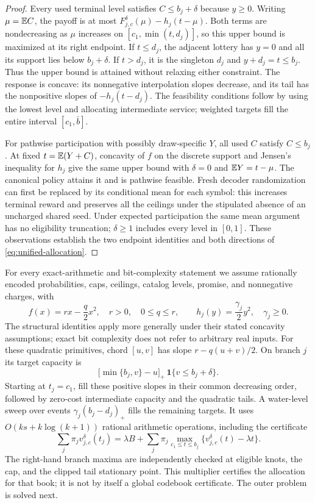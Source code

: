 \begin{proof}
Every used terminal level satisfies $C\leq b_j+\delta$ because $y\geq0$. Writing $\mu=\mathbb E C$, the payoff is at most $F_{j,c}^\delta(\mu)-h_j(t-\mu)$. Both terms are nondecreasing as $\mu$ increases on $[c_1,\min(t,d_j)]$, so this upper bound is maximized at its right endpoint. If $t\leq d_j$, the adjacent lottery has $y=0$ and all its support lies below $b_j+\delta$. If $t>d_j$, it is the singleton $d_j$ and $y+d_j=t\leq b_j$. Thus the upper bound is attained without relaxing either constraint. The response is concave: its nonnegative interpolation slopes decrease, and its tail has the nonpositive slopes of $-h_j(t-d_j)$. The feasibility conditions follow by using the lowest level and allocating intermediate service; weighted targets fill the entire interval $[c_1,\bar b]$.

For pathwise participation with possibly draw-specific $Y$, all used $C$ satisfy $C\leq b_j$. At fixed $t=\mathbb E(Y+C)$, concavity of $f$ on the discrete support and Jensen's inequality for $h_j$ give the same upper bound with $\delta=0$ and $\mathbb E Y=t-\mu$. The canonical policy attains it and is pathwise feasible. Fresh decoder randomization can first be replaced by its conditional mean for each symbol: this increases terminal reward and preserves all the ceilings under the stipulated absence of an uncharged shared seed. Under expected participation the same mean argument has no eligibility truncation; $\delta\geq1$ includes every level in $[0,1]$. These observations establish the two endpoint identities and both directions of \eqref{eq:unified-allocation}.
\end{proof}

For every exact-arithmetic and bit-complexity statement we assume rationally encoded probabilities, caps, ceilings, catalog levels, promise, and nonnegative charges, with
\begin{equation}\label{eq:r34-primitives}
 f(x)=rx-\frac q2 x^2,\quad r>0,\quad 0\leq q\leq r,\qquad
 h_j(y)=\frac{\gamma_j}{2}y^2,\quad\gamma_j\geq0.
\end{equation}
The structural identities apply more generally under their stated concavity assumptions; exact bit complexity does not refer to arbitrary real inputs. For these quadratic primitives, chord $[u,v]$ has slope $r-q(u+v)/2$. On branch $j$ its target capacity is
\[
 \bigl[\min\{b_j,v\}-u\bigr]_+\,\mathbf 1\{v\leq b_j+\delta\}.
\]
Starting at $t_j=c_1$, fill these positive slopes in their common decreasing order, followed by zero-cost intermediate capacity and the quadratic tails. A water-level sweep over events $\gamma_j(b_j-d_j)_+$ fills the remaining targets. It uses $O(ks+k\log(k+1))$ rational arithmetic operations, including the certificate
\begin{equation}\label{eq:prefix-dual}
 \sum_j\pi_jv_{j,c}^\delta(t_j)
 =\lambda B+\sum_j\pi_j\max_{c_1\leq t\leq b_j}
       \{v_{j,c}^\delta(t)-\lambda t\}.
\end{equation}
The right-hand branch maxima are independently checked at eligible knots, the cap, and the clipped tail stationary point. This multiplier certifies the allocation for that book; it is not by itself a global codebook certificate. The outer problem is solved next.


